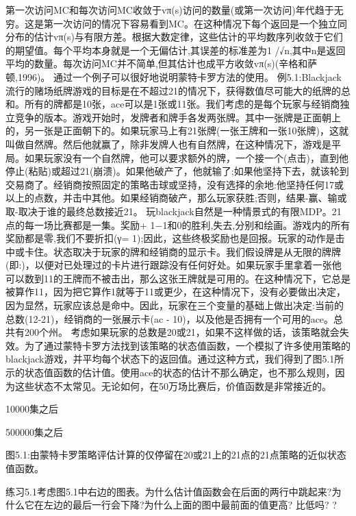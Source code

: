 第一次访问MC和每次访问MC收敛于vπ(s)访问的数量(或第一次访问)年代趋于无穷。这是第一次访问的情况下容易看到MC。在这种情况下每个返回是一个独立同分布的估计vπ(s)与有限方差。根据大数定律，这些估计的平均数序列收敛于它们的期望值。每个平均本身就是一个无偏估计,其误差的标准差为1 /√n,其中n是返回平均的数量。每次访问MC并不简单,但其估计也成平方收敛vπ(s)(辛格和萨顿,1996)。
通过一个例子可以很好地说明蒙特卡罗方法的使用。
例5.1:Blackjack流行的赌场纸牌游戏的目标是在不超过21的情况下，获得数值尽可能大的纸牌的总和。所有的牌都是10张，ace可以是1张或11张。我们考虑的是每个玩家与经销商独立竞争的版本。游戏开始时，发牌者和牌手各发两张牌。其中一张牌是正面朝上的，另一张是正面朝下的。如果玩家马上有21张牌(一张王牌和一张10张牌)，这就叫做自然牌。然后他就赢了，除非发牌人也有自然牌，在这种情况下，游戏是平局。如果玩家没有一个自然牌，他可以要求额外的牌，一个接一个(点击)，直到他停止(粘贴)或超过21(崩溃)。如果他破产了，他就输了;如果他坚持下去，就该轮到交易商了。经销商按照固定的策略击球或坚持，没有选择的余地:他坚持任何17或以上的点数，并击中其他。如果经销商破产，那么玩家获胜;否则，结果-赢、输或取-取决于谁的最终总数接近21。
玩blackjack自然是一种情景式的有限MDP。21点的每一场比赛都是一集。奖励+ 1−1和0的胜利,失去,分别和绘画。游戏内的所有奖励都是零,我们不要折扣(γ= 1);因此，这些终极奖励也是回报。玩家的动作是击中或卡住。状态取决于玩家的牌和经销商的显示卡。我们假设牌是从无限的牌牌(即:)，以便对已处理过的卡片进行跟踪没有任何好处。如果玩家手里拿着一张他可以数到11的王牌而不被击出，那么这张王牌就是可用的。在这种情况下，它总是被算作11，因为把它算作1就等于11或更少，在这种情况下，没有必要做出决定，因为显然，玩家应该总是命中。因此，玩家在三个变量的基础上做出决定:当前的总数(12-21)，经销商的一张展示卡(ac - 10)，以及他是否拥有一个可用的ace。总共有200个州。
考虑如果玩家的总数是20或21，如果不这样做的话，该策略就会失效。为了通过蒙特卡罗方法找到该策略的状态值函数，一个模拟了许多使用策略的blackjack游戏，并平均每个状态下的返回值。通过这种方式，我们得到了图5.1所示的状态值函数的估计值。使用ace的状态的估计不那么确定，也不那么规则，因为这些状态不太常见。无论如何，在50万场比赛后，价值函数是非常接近的。

10000集之后

500000集之后
 


图5.1:由蒙特卡罗策略评估计算的仅停留在20或21上的21点的21点策略的近似状态值函数。



练习5.1考虑图5.1中右边的图表。为什么估计值函数会在后面的两行中跳起来?为什么它在左边的最后一行会下降?为什么上面的图中最前面的值更高?
比低吗? 					?


